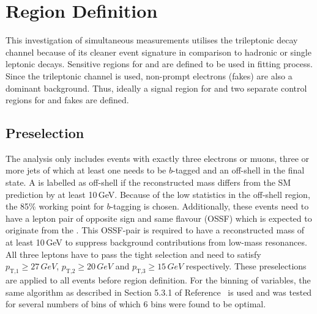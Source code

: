 \documentclass[bachelor,oneside, BCOR10mm,
			ngerman,english  %
]{GAUBM}
\begin{document}
\chapter{Region Definition}
\label{ch:region_definition}
This investigation of simultaneous measurements utilises the trileptonic decay channel because of its cleaner event signature in comparison to hadronic or single leptonic decays. Sensitive regions for \ttbarZ and \ttbarW are defined to be used in fitting process. Since the trileptonic channel is used, non-prompt electrons (fakes) are also a dominant background. Thus, ideally a signal region for \ttbarZ and two separate control regions for \ttbarW and fakes are defined.

\section{Preselection}
\label{sec:preselection}
The analysis only includes events with exactly three electrons or muons, three or more jets of which at least one needs to be $b$-tagged and an off-shell \zboson in the final state. A \zboson is labelled as off-shell if the reconstructed mass differs from the SM prediction by at least 10\,GeV. Because of the low statistics in the off-shell region, the 85\% working point for $b$-tagging is chosen. Additionally, these events need to have a lepton pair of opposite sign and same flavour (OSSF) which is expected to originate from the \zboson. This OSSF-pair is required to have a reconstructed mass of at least 10\,GeV to suppress background contributions from low-mass resonances. All three leptons have to pass the tight selection and need to satisfy $p_\text{T,1}\geq27\,\unit{GeV}$, $p_\text{T,2}\geq20\,\unit{GeV}$ and $p_\text{T,3}\geq15\,\unit{GeV}$ respectively. These preselections are applied to all events before region definition. For the binning of variables, the same algorithm as described in Section 5.3.1 of Reference~\cite{algorithm_transfod} is used and was tested for several numbers of bins of which 6 bins were found to be optimal.

\end{document}
